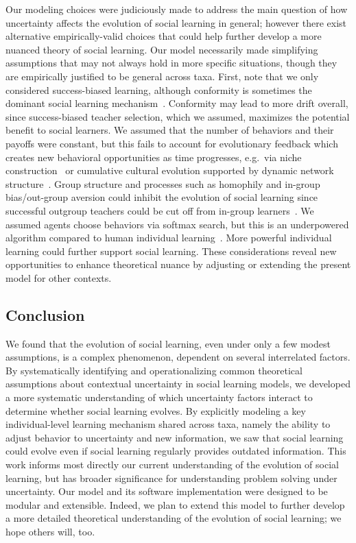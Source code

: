 \documentclass[letterpaper,11.5pt]{scrartcl}
\begin{document}
Our modeling choices were judiciously made to address the main question of how
uncertainty affects the evolution of social learning in general; however there exist
alternative empirically-valid choices that could help further develop a more nuanced
theory of social learning.  Our model necessarily made simplifying assumptions that
may not always hold in more specific situations, though they are empirically justified
to be general across taxa. First, note that we only considered success-biased
learning, although conformity is sometimes the dominant social learning
mechanism~\cite{Muthukrishna2016a,Smaldino2018b}.  Conformity may lead to more drift
overall, since success-biased teacher selection, which we assumed, maximizes the
potential benefit to social learners. We assumed that the number of behaviors and
their payoffs were constant, but this fails to account for evolutionary feedback which
creates new behavioral opportunities as time progresses, e.g.\ via niche
construction~\cite{Smaldino2012a,Heras-Escribano2020} or cumulative cultural evolution
supported by dynamic network structure~\cite{Smolla2019,Derex2020}.  Group structure
and processes such as homophily and in-group bias/out-group aversion could inhibit the
evolution of social learning since successful outgroup teachers could be cut off from
in-group learners~\cite{Jackson2012}. We assumed agents choose behaviors via softmax
search, but this is an underpowered algorithm compared to human individual
learning~\cite{Schulz2020a,Wu2022}.  More powerful individual learning could further
support social learning.  These considerations reveal new opportunities to enhance
theoretical nuance by adjusting or extending the present model for other contexts. 


\subsection{Conclusion}

We found that the evolution of social learning, even under only a few modest 
assumptions, is a complex phenomenon, dependent on several interrelated factors. 
By systematically
identifying and operationalizing common theoretical assumptions about contextual
uncertainty in social learning models, we developed a more systematic
understanding of which uncertainty factors interact to determine whether social
learning evolves. By explicitly modeling a key individual-level learning mechanism
shared across taxa, namely the ability to adjust behavior to uncertainty and new
information, we saw that social learning could evolve even if social learning
regularly provides outdated information. This work informs most directly our current
understanding of the evolution of social learning, but has broader significance for
understanding problem solving under uncertainty. Our model and its software
implementation were designed to be modular and extensible.  Indeed, we plan to extend
this model to further develop a more detailed theoretical understanding of the
evolution of social learning; we hope others will, too.
\end{document}
